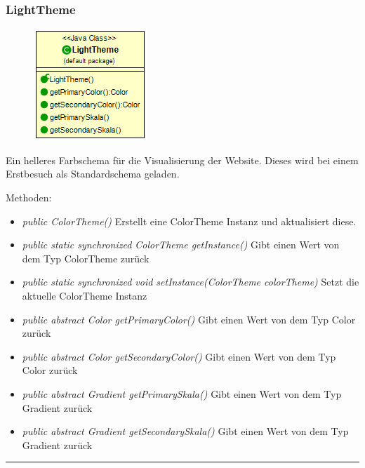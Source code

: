 \subsubsection{LightTheme}
\begin{minipage}{0.3\textwidth}
    \begin{figure}[H]
        {\centering\includegraphics[scale = 0.5
        ]{media/view/theme/LightTheme_Class.png}}
    \end{figure}
    \end{minipage} \hfill
    \begin{minipage}{0.6\textwidth}
        Ein helleres Farbschema für die Visualisierung der Website. Dieses wird bei einem Erstbesuch als Standardschema geladen.
    \end{minipage}
    \vspace{\baselineskip}
Methoden: \begin{itemize} [noitemsep]
    \item \emph{public ColorTheme()} Erstellt eine ColorTheme Instanz und aktualisiert diese.
    \item \emph{public static synchronized ColorTheme getInstance()} Gibt einen Wert von dem Typ ColorTheme zurück
    \item \emph{public static synchronized void setInstance(ColorTheme colorTheme)} Setzt die aktuelle ColorTheme Instanz
    \item \emph{public abstract Color getPrimaryColor()} Gibt einen Wert von dem Typ Color zurück
    \item \emph{public abstract Color getSecondaryColor()} Gibt einen Wert von dem Typ Color zurück
    \item \emph{public abstract Gradient getPrimarySkala()} Gibt einen Wert von dem Typ Gradient zurück
    \item \emph{public abstract Gradient getSecondarySkala()}  Gibt einen Wert von dem Typ Gradient zurück
\end{itemize}

\rule{\textwidth}{0.4pt}
